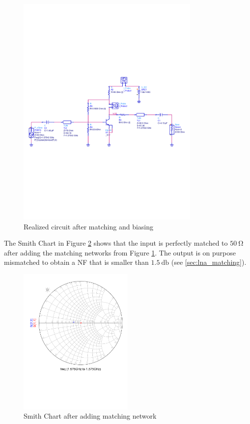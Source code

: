 \documentclass[a4paper]{article}        %
\begin{document}
			\begin{figure}[H]
				\centering
				\includegraphics[width=0.8\textwidth]{fig/LNA/LNA_matched.pdf}
			\caption{Realized circuit after matching and biasing}
			\label{fig:lna_pre_layout}
			\end{figure} 

			The Smith Chart in Figure \ref{fig:lna_matching_smith} shows that the input is perfectly matched to $\SI{50}{\ohm}$ after adding the matching networks from Figure \ref{fig:lna_pre_layout}. The output is on purpose mismatched to obtain a NF that is smaller than $\SI{1.5}{\decibel}$ (see \ref{sec:lna_matching}).

			\begin{figure}[H]
			\centering
				\includegraphics[width=0.5\textwidth]{fig/LNA/matching_smith.pdf}
			\caption{Smith Chart after adding matching network}
			\label{fig:lna_matching_smith}
			\end{figure}
\end{document}
